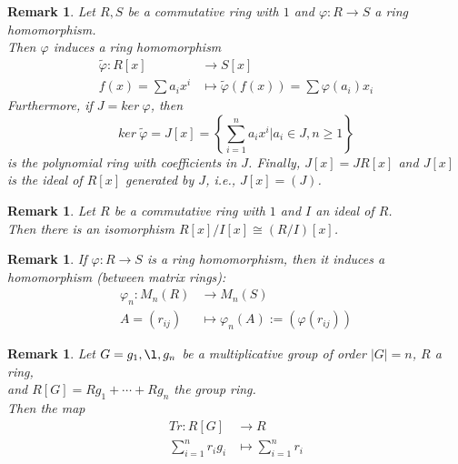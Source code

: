 \documentclass[a4paper,8pt]{article}
\theoremstyle{theorem}
\newtheorem{remark}[theorem]{Remark}
\begin{document}
\begin{remark}
Let $R, S$ be a commutative ring with $1$ and $\varphi: R \rightarrow S$ a ring homomorphism.\\
Then $\varphi$ induces a ring homomorphism 
\begin{align}
\tilde{\varphi}: R[x] &\rightarrow S[x] \nonumber \\
f(x)=\sum a_i x^i &\mapsto \widetilde{\varphi}(f(x)) = \sum \varphi(a_i) x_i \nonumber
\end{align}
Furthermore, if $J=ker \ \varphi$, then 
\begin{equation}
ker \ \widetilde{\varphi} = J[x] = \left\{\sum_{i=1}^{n} a_i x^i | a_i \in J, n \geq 1 \right\} \nonumber
\end{equation}
is the polynomial ring with coefficients in $J$.
Finally, $J[x] = J R[x]$ and $J[x]$ is the ideal of $R[x]$ generated by $J$, i.e., $J[x] = (J)$.\\
\end{remark}


\begin{remark}
Let $R$ be a commutative ring with $1$ and $I$ an ideal of $R$.\\
Then there is an isomorphism $R[x]/I[x] \cong (R/I)[x]$.\\	
\end{remark}


\begin{remark}
If $\varphi: R \rightarrow S$ is a ring homomorphism, then it induces a homomorphism (between matrix rings):
\begin{align}
\varphi_n: M_n(R) &\rightarrow M_n(S) \nonumber \\
A = (r_{ij}) &\mapsto \varphi_n(A) := (\varphi(r_{ij})) \nonumber
\end{align}
\end{remark}


\begin{remark}
Let $G={g_1, \l , g_n}$ be a multiplicative group of order $\left| G \right| = n$, $R$ a ring, \\
and $R[G]=Rg_1 + \cdots + Rg_n$ the group ring.\\
Then the map 
\begin{align}
Tr: R[G] &\rightarrow R \nonumber \\
\sum_{i=1}^{n} r_i g_i &\mapsto \sum_{i=1}^{n} r_i \nonumber
\end{align}
\end{remark}
\end{document}
